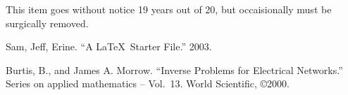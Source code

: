 \documentclass{amsart}
\theoremstyle{definition} %
\begin{document}
This item goes without notice 19 years out of 20, but occaisionally
must be surgically removed.


\begin{thebibliography}{99}

Sam, Jeff, Erine.  ``A \LaTeX\ Starter File.''  2003.

Burtis, B., and James A. Morrow.  ``Inverse Problems
for Electrical Networks.''  Series on applied mathematics -- Vol.\ 13.
World Scientific, \copyright 2000.

\end{thebibliography}
\end{document}
